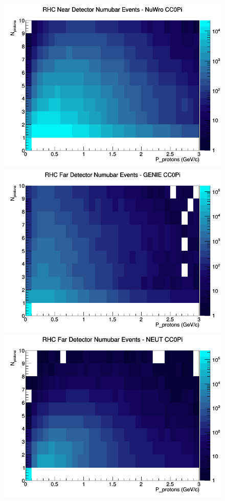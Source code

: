 \begin{figure}[h]
\includegraphics[width=\linewidth]{N_P/nominal/protons/CC0Pi_RHC_ND_numubar_N_P_NuWro.png}
\endminipage
\newline
{}
\includegraphics[width=\linewidth]{N_P/nominal/protons/CC0Pi_RHC_FD_numubar_N_P_GENIE.png}
\endminipage
{}
\includegraphics[width=\linewidth]{N_P/nominal/protons/CC0Pi_RHC_FD_numubar_N_P_NEUT.png}

\end{figure}
